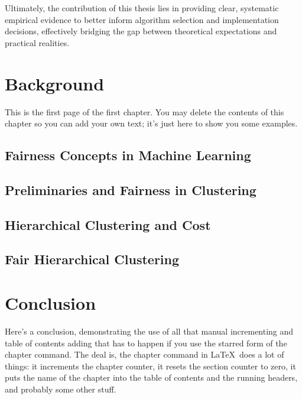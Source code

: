 \documentclass[12pt,twoside]{reedthesis}
\begin{document}
Ultimately, the contribution of this thesis lies in providing clear,
systematic empirical evidence to better inform algorithm selection
and implementation decisions, effectively bridging the gap between
theoretical expectations and practical realities.

\chapter{Background}
This is the first page of the first chapter. You may delete the
contents of this chapter so you can add your own text; it's just here
to show you some examples.

\section{Fairness Concepts in Machine Learning}\label{sec:fairness_concepts}


\section{Preliminaries and Fairness in Clustering}\label{sec:fair_clustering}


\section{Hierarchical Clustering and Cost}


\section{Fair Hierarchical
Clustering}\label{subsec:fair_hierarchical_clustering}




\chapter*{Conclusion}
\setcounter{chapter}{4}
\setcounter{section}{0}

Here's a conclusion, demonstrating the use of all that manual
incrementing and table of contents adding that has to happen if you
use the starred form of the chapter command. The deal is, the chapter
command in \LaTeX\ does a lot of things: it increments the chapter
counter, it resets the section counter to zero, it puts the name of
the chapter into the table of contents and the running headers, and
probably some other stuff.
\end{document}
